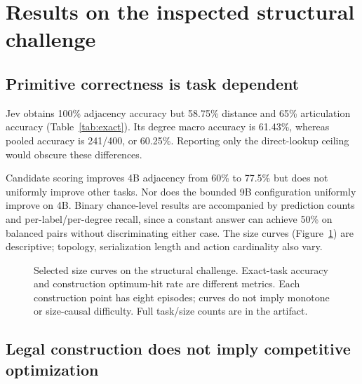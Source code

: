 \section{Results on the inspected structural challenge}
\label{app:original-results}
\begin{table}[t]
\centering\small

\caption{Exact-task macro-size accuracy (\%). All four methods complete all
960 challenge instances. Each binary task has eighty cases; degree has 400.
These are bounded configurations, not unrestricted model-capacity rankings.}
\label{tab:exact}
\end{table}

\subsection{Primitive correctness is task dependent}
Jev obtains 100\% adjacency accuracy but 58.75\% distance and 65\%
articulation accuracy (Table~\ref{tab:exact}). Its degree macro accuracy is
61.43\%, whereas pooled accuracy is 241/400, or 60.25\%. Reporting only
the direct-lookup ceiling would obscure these differences.

Candidate scoring improves 4B adjacency from 60\% to 77.5\% but does not
uniformly improve other tasks. Nor does the bounded 9B configuration
uniformly improve on 4B. Binary chance-level results are accompanied by
prediction counts and per-label/per-degree recall, since a constant answer
can achieve 50\% on balanced pairs without discriminating either case.
The size curves (Figure~\ref{fig:size}) are descriptive; topology,
serialization length and action cardinality also vary.

\begin{figure}[t]
\centering

\caption{Selected size curves on the structural challenge. Exact-task
accuracy and construction optimum-hit rate are different metrics. Each
construction point has eight episodes; curves do not imply monotone or
size-causal difficulty. Full task/size counts are in the artifact.}
\label{fig:size}
\end{figure}

\subsection{Legal construction does not imply competitive optimization}
\begin{table}[t]
\centering\small

\caption{Optimal solutions over forty scheduled episodes per construction
task. Classical references use separate revisable full-solution algorithms.
All model episodes in this table are feasible.}
\label{tab:optimal}
\end{table}
\begin{table}[t]
\centering\small
\resizebox{\textwidth}{!}{}
\caption{Mean additive objective gap, lower is better. Uniform is the exact
expected gap of uniform legal decisions, not a sampled solver. Columns are
comparable within a row only; the four objectives have different units.}
\label{tab:gaps}
\end{table}

